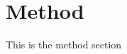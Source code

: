 \section{Method}\label{sec:method}
This is the method section \cite{linGraphenhancedLargeLanguage2024}
